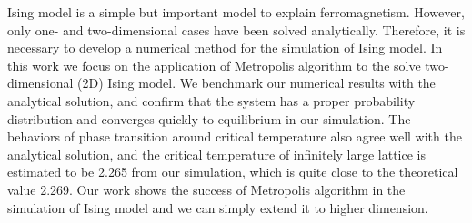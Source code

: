 Ising model is a simple but important model to explain ferromagnetism. 
However, only one- and two-dimensional cases have been solved analytically. 
Therefore, it is necessary to develop a numerical method for the simulation of Ising model. 
In this work we focus on the application of Metropolis algorithm to the solve two-dimensional (2D) Ising model. 
We benchmark our numerical results with the analytical solution, 
and confirm that the system has a proper probability distribution and converges quickly to equilibrium in our simulation. 
The behaviors of phase transition around critical temperature also agree well with the analytical solution, 
and the critical temperature of infinitely large lattice is estimated to be 2.265 from our simulation, 
which is quite close to the theoretical value 2.269. 
Our work shows the success of Metropolis algorithm in the simulation of Ising model and 
we can simply extend it to higher dimension.  

